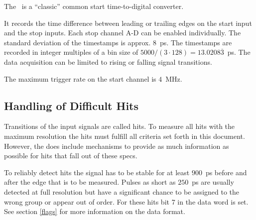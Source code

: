  { %
The \deviceName\ is a ``classic'' common start time-to-digital converter. 

It records the time difference between leading or trailing edges on the start input and the stop inputs. 
Each stop channel A-D can be enabled individually. 
The standard deviation of the timestamps is approx. $8$~ps. 
The timestamps are recorded in integer multiples of a bin size of $5000/(3\cdot 128) = 13.0208\overline{3}$~ps. 
The data acquisition can be limited to rising or falling signal transitions. 

The maximum trigger rate on the start channel is $4$~MHz.

\subsection{Handling of Difficult Hits}
    \label{difficulthits}
    Transitions of the input signals are called hits. To measure all hits with the maximum resolution the hits must fulfill all criteria set forth in this document.
    However, the \deviceName does include mechanisms to provide as much information as possible for hits that fall out of these specs.

    To reliably detect hits the signal has to be stable for at least $900$~ps before and after the edge that is to be measured. 
    Pulses as short as $250$~ps are usually detected at full resolution but have a significant chance to be assigned to the wrong group or appear out of order. 
    For these hits bit 7 in the data word is set. See section \ref{flags} for more information on the data format.

}
